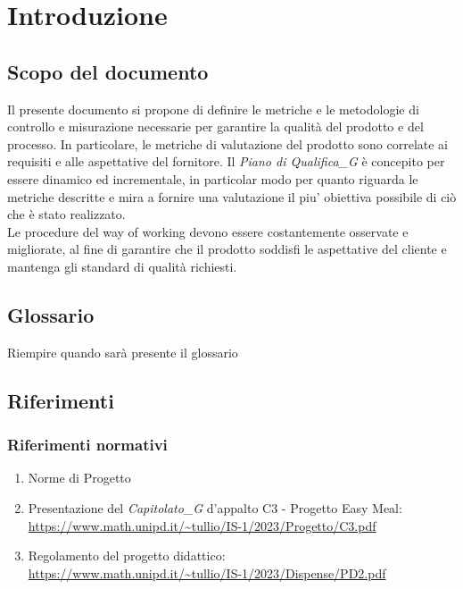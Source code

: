 \section{Introduzione}
\subsection{Scopo del documento}
Il presente documento si propone di definire le metriche e le metodologie di controllo e misurazione necessarie per garantire la qualità del prodotto e del processo. In particolare, le metriche di valutazione del prodotto sono correlate ai requisiti e alle aspettative del fornitore.
Il \textit{Piano di Qualifica_G} è concepito per essere dinamico ed incrementale, in particolar modo per quanto riguarda le metriche descritte e mira a fornire una valutazione il piu' obiettiva possibile di ciò che è stato realizzato.\\
Le procedure del way of working devono essere costantemente osservate e migliorate, al fine di garantire che il prodotto soddisfi le aspettative del cliente e mantenga gli standard di qualità richiesti.
\subsection{Glossario}
Riempire quando sarà presente il glossario
\subsection{Riferimenti}
\subsubsection{Riferimenti normativi}
\begin{enumerate}
    \item Norme di Progetto
    \item Presentazione del \textit{Capitolato_G} d'appalto C3 - Progetto Easy Meal: \\ 
    \url{https://www.math.unipd.it/~tullio/IS-1/2023/Progetto/C3.pdf}
    \item Regolamento del progetto didattico: \\ 
    \url{https://www.math.unipd.it/~tullio/IS-1/2023/Dispense/PD2.pdf}
\end{enumerate}

